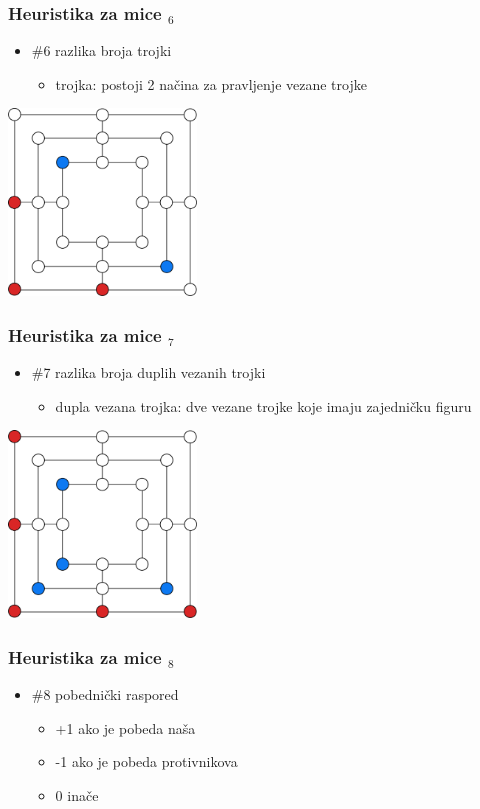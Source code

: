 \documentclass[compress,aspectratio=169]{beamer}
\begin{document}
\begin{frame}[fragile]
  \frametitle{Heuristika za mice $_6$}
  \begin{itemize}
    \item \#6 razlika broja trojki
    \begin{itemize}
      \item trojka: postoji 2 načina za pravljenje vezane trojke
    \end{itemize}
  \end{itemize}
  \begin{center}
    \includegraphics[width=5cm]{prj-01-pic17.pdf}
  \end{center}
\end{frame}

\begin{frame}[fragile]
  \frametitle{Heuristika za mice $_7$}
  \begin{itemize}
    \item \#7 razlika broja duplih vezanih trojki
    \begin{itemize}
      \item dupla vezana trojka: dve vezane trojke koje imaju zajedničku figuru
    \end{itemize}
  \end{itemize}
  \begin{center}
    \includegraphics[width=5cm]{prj-01-pic18.pdf}
  \end{center}
\end{frame}

\begin{frame}[fragile]
  \frametitle{Heuristika za mice $_8$}
  \begin{itemize}
    \item \#8 pobednički raspored
    \begin{itemize}
      \item +1 ako je pobeda naša
      \item -1 ako je pobeda protivnikova
      \item 0 inače
    \end{itemize}
  \end{itemize}
\end{frame}
\end{document}
